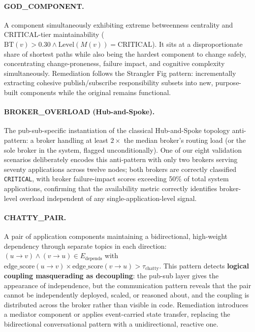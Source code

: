 \documentclass[11pt]{article}
\begin{document}
\paragraph{GOD\_COMPONENT.} A component simultaneously exhibiting extreme betweenness centrality and
CRITICAL-tier maintainability ($\mathrm{BT}(v) > 0.30 \wedge \mathrm{Level}(M(v)) = \mathrm{CRITICAL}$).
It sits at a disproportionate share of shortest paths while also being the hardest component to change
safely, concentrating change-proneness, failure impact, and cognitive complexity simultaneously.
Remediation follows the Strangler Fig pattern: incrementally extracting cohesive publish/subscribe
responsibility subsets into new, purpose-built components while the original remains functional.

\paragraph{BROKER\_OVERLOAD (Hub-and-Spoke).} The pub-sub-specific instantiation of the classical
Hub-and-Spoke topology anti-pattern: a broker handling at least $2\times$ the median broker's routing
load (or the sole broker in the system, flagged unconditionally). One of our eight validation scenarios
deliberately encodes this anti-pattern with only two brokers serving seventy applications across twelve
nodes; both brokers are correctly classified \texttt{CRITICAL}, with broker failure-impact scores
exceeding 50\% of total system applications, confirming that the availability metric correctly
identifies broker-level overload independent of any single-application-level signal.

\paragraph{CHATTY\_PAIR.} A pair of application components maintaining a bidirectional, high-weight
dependency through separate topics in each direction: $(u \to v) \wedge (v \to u) \in
E_{\text{depends}}$ with $\mathrm{edge\_score}(u{\to}v) \times \mathrm{edge\_score}(v{\to}u) >
\tau_{\text{chatty}}$. This pattern detects \textbf{logical coupling masquerading as decoupling}: the
pub-sub layer gives the appearance of independence, but the communication pattern reveals that the
pair cannot be independently deployed, scaled, or reasoned about, and the coupling is distributed
across the broker rather than visible in code. Remediation introduces a mediator component or applies
event-carried state transfer, replacing the bidirectional conversational pattern with a
unidirectional, reactive one.
\end{document}
